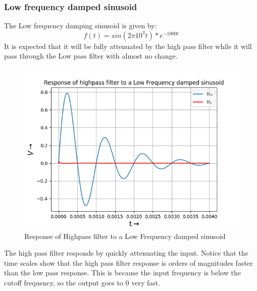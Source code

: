 \documentclass{article}
\begin{document}
\subsubsection{Low frequency damped sinusoid}
The Low frequency damping sinusoid is given by:
\begin{equation}
	f(t) = sin(2\pi10^3t)*e^{-1000t}
\end{equation}
It is expected that it will be fully attenuated by the high pass filter while it will pass through the Low pass filter with almost no change.
\begin{figure}[h!]
	\centering
	\includegraphics[scale=0.6]{Figure_7.png}
	\caption{Response of Highpass filter to a Low Frequency damped sinusoid}
	\label{fig:Response of Highpass filter to a Low Frequency damped sinusoid}
\end{figure}

The high pass filter responds by quickly attenuating the input. Notice that the time scales show that the high pass filter response is orders of magnitudes faster than the low pass response. This is because the input frequency is below the cutoff frequency, so the output goes to $0$ very fast.

\clearpage
\end{document}
